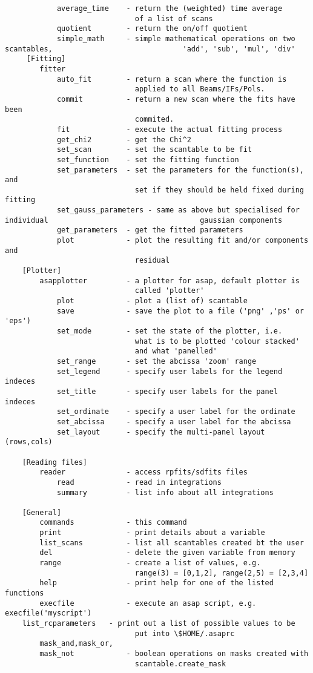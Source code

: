 \documentclass[11pt]{article}
\begin{document}
\begin{verbatim}
            average_time    - return the (weighted) time average
                              of a list of scans
            quotient        - return the on/off quotient
            simple_math     - simple mathematical operations on two scantables,                              'add', 'sub', 'mul', 'div'
     [Fitting]
        fitter
            auto_fit        - return a scan where the function is
                              applied to all Beams/IFs/Pols.
            commit          - return a new scan where the fits have been
                              commited.
            fit             - execute the actual fitting process
            get_chi2        - get the Chi^2
            set_scan        - set the scantable to be fit
            set_function    - set the fitting function
            set_parameters  - set the parameters for the function(s), and
                              set if they should be held fixed during fitting
            set_gauss_parameters - same as above but specialised for individual                                   gaussian components
            get_parameters  - get the fitted parameters
            plot            - plot the resulting fit and/or components and
                              residual
    [Plotter]
        asapplotter         - a plotter for asap, default plotter is
                              called 'plotter'
            plot            - plot a (list of) scantable
            save            - save the plot to a file ('png' ,'ps' or 'eps')
            set_mode        - set the state of the plotter, i.e.
                              what is to be plotted 'colour stacked'
                              and what 'panelled'
            set_range       - set the abcissa 'zoom' range
            set_legend      - specify user labels for the legend indeces
            set_title       - specify user labels for the panel indeces
            set_ordinate    - specify a user label for the ordinate
            set_abcissa     - specify a user label for the abcissa
            set_layout      - specify the multi-panel layout (rows,cols)

    [Reading files]
        reader              - access rpfits/sdfits files
            read            - read in integrations
            summary         - list info about all integrations

    [General]
        commands            - this command
        print               - print details about a variable
        list_scans          - list all scantables created bt the user
        del                 - delete the given variable from memory
        range               - create a list of values, e.g.
                              range(3) = [0,1,2], range(2,5) = [2,3,4]
        help                - print help for one of the listed functions
        execfile            - execute an asap script, e.g. execfile('myscript')
	list_rcparameters   - print out a list of possible values to be
                              put into \$HOME/.asaprc
        mask_and,mask_or,
        mask_not            - boolean operations on masks created with
                              scantable.create_mask


\end{verbatim}
\end{document}
